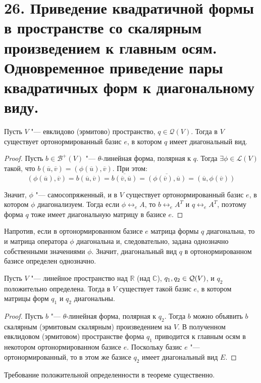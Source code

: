 \section{26. Приведение квадратичной формы в пространстве со скалярным произведением к главным осям. Одновременное приведение пары квадратичных форм к диагональному виду.}

\begin{theorem}
	Пусть $V$ "--- евклидово (эрмитово) пространство,  $q \in \mathcal{Q}(V)$. Тогда в $V$ существует ортонормированный базис $e$, в котором $q$ имеет диагональный вид.
\end{theorem}

\begin{proof}
	Пусть $b \in \mathcal{B}^+(V)$ "--- $\theta$-линейная форма, полярная к $q$. Тогда $\exists \phi \in \mathcal{L}(V)$ такой, что $b(\overline{u}, \overline{v}) = (\phi(\overline{u}), \overline{v})$. При этом:
	\[(\phi(\overline{u}), \overline{v}) = b(\overline{u}, \overline{v}) = \overline{b(\overline{v}, \overline{u})} = \overline{(\phi(\overline{v}), \overline{u})} = (\overline{u}, \phi(\overline{v}))\]
	
	Значит, $\phi$ "--- самосопряженный, и в $V$ существует ортонормированный базис $e$, в котором $\phi$ диагонализуем. Тогда если $\phi \leftrightarrow_e A$, то $b \leftrightarrow_e A^T$ и $q \leftrightarrow_e A^T$, поэтому форма $q$ тоже имеет диагональную матрицу в базисе $e$.
\end{proof}

\begin{note}
	Напротив, если в ортонормированном базисе $e$ матрица формы $q$ диагональна, то и матрица оператора $\phi$ диагональна и, следовательно, задана однозначно собственными значениями $\phi$. Значит, диагональный вид $q$ в ортонормированном базисе определен однозначно.
\end{note}

\begin{theorem}
	Пусть $V$ "--- линейное пространство над $\mathbb{R}$ (над $\mathbb{C}$), $q_1, q_2 \hm{\in} \mathcal{Q}(V)$, и $q_2$ положительно определена. Тогда в $V$ существует такой базис $e$, в котором матрицы форм $q_1$ и $q_2$ диагональны.
\end{theorem}

\begin{proof}
	Пусть $b$ "--- $\theta$-линейная форма, полярная к $q_2$. Тогда $b$  можно объявить $b$ скалярным (эрмитовым скалярным) произведением на $V$. В полученном евклидовом (эрмитовом) пространстве форма $q_1$ приводится к главным осям в некотором ортонормированном базисе $e$. Поскольку базис $e$ "--- ортонормированный, то в этом же базисе $q_2$ имеет диагональный вид $E$.
\end{proof}

\begin{note}
	Требование положительной определенности в теореме существенно.
\end{note}